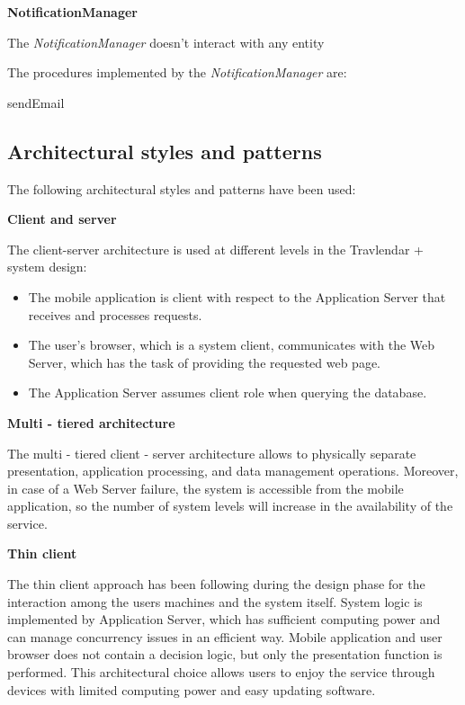 \documentclass{article}
\begin{document}
	\bigskip
	\noindent
	\textbf{NotificationManager}

	\bigskip
	\noindent
	The \textit{NotificationManager} doesn't interact with any entity

	\bigskip
	The procedures implemented by the \textit{NotificationManager} are:
	\begin{description}
	\item [sendEmail]
	\end{description}


	\subsection{Architectural styles and patterns}
	The following architectural styles and patterns have been used:
	
	\bigskip
	\noindent
	\textbf{Client and server}
	
	\bigskip
	\noindent
	The client-server architecture is used at different levels in the Travlendar + system design:
	\begin{itemize}
	\item The mobile application is client with respect to the Application Server that receives and processes requests.
	\item The user’s browser, which is a system client, communicates with the Web Server, which has the task of providing the requested web page.
	\item The Application Server assumes client  role when querying the database.
	\end{itemize}	

	\bigskip
	\noindent
	\textbf{Multi - tiered architecture}
	
	\bigskip
	\noindent
	The multi - tiered client - server architecture allows to physically separate presentation, application processing, and data management operations.
	Moreover, in case of a Web Server failure, the system is accessible from the mobile application, so the number of system levels will increase in the availability of the service.

	\bigskip
	\noindent
	\textbf{Thin client}

	\bigskip
	\noindent
	The thin client approach has been following during the design phase for  the interaction among the users machines and the system itself.
	System logic is implemented by Application Server, which has sufficient computing power and can manage concurrency issues in an efficient way.
	Mobile application and user browser does not contain a decision logic, but only the presentation function is performed.
	This architectural choice allows users to enjoy the service through devices with limited computing power and easy updating software.
\end{document}
